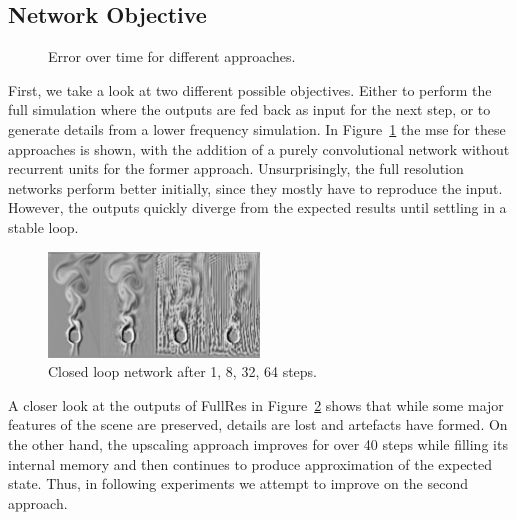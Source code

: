 \documentclass[sigconf]{acmart}
\begin{document}
\subsection{Network Objective}\label{sec:eva:objective}
\begin{figure}
	\caption{Error over time for different approaches.}
	\label{objectiveError}
\end{figure}
First, we take a look at two different possible objectives. Either to perform the full simulation where the outputs are fed back as input for the next step, or to generate details from a lower frequency simulation.
In Figure~\ref{objectiveError} the mse for these approaches is shown, with the addition of a purely convolutional network without recurrent units for the former approach. Unsurprisingly, the full resolution networks perform better initially, since they mostly have to reproduce the input. However, the outputs quickly diverge from the expected results until settling in a stable loop.
\begin{figure}
	\includegraphics[width=0.5\textwidth]{imgs/fullres_series.png}
	\caption{Closed loop network after 1, 8, 32, 64 steps.}
	\label{closedLoop}
\end{figure}
A closer look at the outputs of FullRes in Figure~\ref{closedLoop} shows that while some major features of the scene are preserved, details are lost and artefacts have formed. On the other hand, the upscaling approach improves for over 40 steps while filling its internal memory and then continues to produce approximation of the expected state. Thus, in following experiments we attempt to improve on the second approach.
\end{document}
